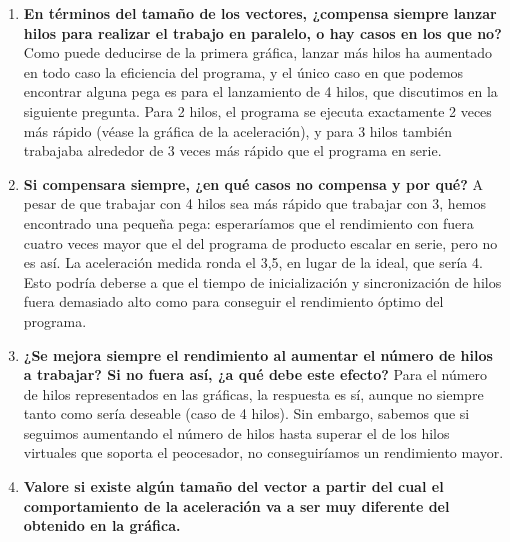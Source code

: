 \documentclass{report}
\newcommand\tab[1][0.6cm]{\hspace*{#1}}
\newcommand\nl{\newline\tab}
\begin{document}
\begin{enumerate}
		\item{\textbf{\tab En	términos	del	tamaño	de	los	vectores,	¿compensa	siempre	lanzar	hilos	para	realizar	el	trabajo	en	
				paralelo,	o	hay	casos	en	los	que	no?	 }\nl
			Como puede deducirse de la primera gráfica, lanzar más hilos ha aumentado en todo caso la eficiencia del programa, y el único caso en que podemos encontrar alguna pega es para el lanzamiento de 4 hilos, que discutimos en la siguiente pregunta. 
			\nl Para 2 hilos, el programa se ejecuta exactamente 2 veces más rápido (véase la gráfica de la aceleración), y para 3 hilos también trabajaba alrededor de 3 veces más rápido que el programa en serie.
		}
		\item{\textbf{\tab Si	compensara	siempre,	¿en	qué	casos	no	compensa	y	por	qué?	}\nl
			A pesar de que trabajar con 4 hilos sea más rápido que trabajar con 3, hemos encontrado una pequeña pega: esperaríamos que el rendimiento con fuera cuatro veces mayor que el del programa de producto escalar en serie, pero no es así. La aceleración medida ronda el 3,5, en lugar de la ideal, que sería 4.
			\nl Esto podría deberse a que el tiempo de inicialización y sincronización de hilos fuera demasiado alto como para conseguir el rendimiento óptimo del programa.
		}
		\item{\textbf{\tab ¿Se	mejora	siempre	el	rendimiento	al	aumentar	el	número	de	hilos	a	trabajar?	Si	no	fuera	así,	¿a	qué	debe	este	efecto?
			}\nl
			Para el número de hilos representados en las gráficas, la respuesta es sí, aunque no siempre tanto como sería deseable (caso de 4 hilos). Sin embargo, sabemos que si seguimos aumentando el número de hilos hasta superar el de los hilos virtuales que soporta el peocesador, no conseguiríamos un rendimiento mayor.
		}
		\item{\textbf{\tab Valore	si	existe	algún	tamaño	del	vector	a	partir	del	cual	el	comportamiento	de	la	aceleración	va	a	
				ser	muy	diferente	del	obtenido	en	la	gráfica.	}\nl
			
		}
	\end{enumerate}
	\newpage
	
	
\end{document}
